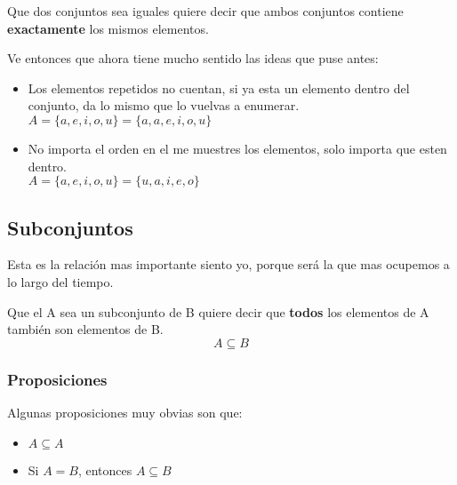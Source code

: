 \documentclass[12pt]{report}                                    %
\begin{document}
            Que dos conjuntos sea iguales quiere decir que ambos conjuntos contiene \textbf{exactamente}
            los mismos elementos.

            Ve entonces que ahora tiene mucho sentido las ideas que puse antes:

            \begin{itemize}
                \item Los elementos repetidos no cuentan, si ya esta un elemento dentro del
                    conjunto, da lo mismo que lo vuelvas a enumerar.\\
                    $A = \{a, e, i, o, u\} = \{a, a, e, i, o, u\}$

                \item No importa el orden en el me muestres los elementos,
                    solo importa que esten dentro.\\
                    $A = \{a, e, i, o, u\} = \{u, a, i, e, o\}$
            \end{itemize}


        \clearpage
        \subsection{Subconjuntos}

            Esta es la relación mas importante siento yo, porque será la que mas ocupemos a lo largo
            del tiempo.

            Que el A sea un subconjunto de B quiere decir que \textbf{todos} los elementos de A
            también son elementos de B.
            \begin{equation}
                A \subseteq B
            \end{equation}

            \subsubsection{Proposiciones}

            Algunas proposiciones muy obvias son que:
            \begin{itemize}
                \item $A \subseteq A$
                \item Si $A = B$, entonces $A \subseteq B$
            \end{itemize}
\end{document}
